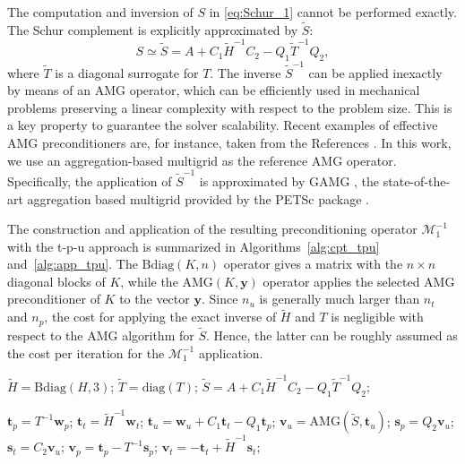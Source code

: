 \documentclass[3p,times]{elsarticle}
\theoremstyle{plain}
\newcommand{\Mat}[1]{#1}
\newcommand{\tS}{\widetilde{S}}
\newcommand{\tH}{\widetilde{H}}
\newcommand{\tT}{\widetilde{T}}
\begin{document}
The computation and inversion of $S$ in \eqref{eq:Schur_1} cannot be performed exactly. The Schur complement is explicitly approximated by $\tS$:
\begin{equation}
    S \simeq \tS = A + C_1 \Mat{\tH}^{-1} C_2 - Q_1 \tT^{-1} Q_2,
    \label{eq:appSchur_1}
\end{equation}
where $\tT$ is a diagonal surrogate for $T$. The inverse $\tS^{-1}$ can be applied inexactly by means of an AMG operator, which can be efficiently used in mechanical problems preserving a linear complexity with respect to the problem size. This is a key property to guarantee the solver scalability. Recent examples of effective AMG preconditioners are, for instance, taken from the References \cite{brandt2014bootstrap,
dambra2018bootcmatch, dambra2019improving, paludetto2019novel}. In this work, we use an aggregation-based multigrid as
the reference AMG operator. Specifically, the application of $\tS^{-1}$ is approximated by GAMG \cite{may2016extreme}, the
state-of-the-art aggregation based multigrid provided by the PETSc package
\cite{petsc-user-ref}. 

The construction and application of the resulting preconditioning operator $\mathcal{M}_1^{-1}$ with the t-p-u approach is summarized in Algorithms~\ref{alg:cpt_tpu} and~\ref{alg:app_tpu}. The $\text{Bdiag}(K,n)$ operator gives a matrix with the $n\times n$ diagonal blocks of $K$, while the $\text{AMG}(K,\mathbf{y})$ operator applies the selected AMG preconditioner of $K$ to the vector $\mathbf{y}$. Since $n_u$ is generally much larger than $n_t$ and $n_p$, the cost for applying the exact inverse of $\tH$ and $T$ is negligible with respect to the AMG algorithm for $\tS$. Hence, the latter can be roughly assumed as the cost per iteration for the $\mathcal{M}_1^{-1}$ application. 

\begin{algorithm}
\caption{ {\sc Preconditioner Construction: t-p-u approach}
[$\tH$, $\tS$]=cpt\_tpu($\mathcal{J}$).}
\label{alg:cpt_tpu}
\begin{algorithmic}[1]
\State $\tH = \text{Bdiag}(H,3)$;
\State $\tT = \text{diag}(T)$;
\State $\tS = A + C_1 \tH^{-1} C_2 - Q_1 \tT^{-1} Q_2$;
\end{algorithmic}
\end{algorithm}

\begin{algorithm}
\caption{ {\sc Preconditioner Application: t-p-u approach}
[$\mathbf{v}_u$, $\mathbf{v}_t$, $\mathbf{v}_p$]=app\_tpu($\mathcal{J}$, $\tH$, $\tS$, $\mathbf{w}_u$, $\mathbf{w}_t$, $\mathbf{w}_p$).}
\label{alg:app_tpu}
\begin{algorithmic}[1]
\State $\mathbf{t}_p = T^{-1} \mathbf{w}_p$;
\State $\mathbf{t}_t = \tH^{-1} \mathbf{w}_t$;
\State $\mathbf{t}_u = \mathbf{w}_u + C_1 \mathbf{t}_t - Q_1 \mathbf{t}_p$;
\State $\mathbf{v}_u = \text{AMG}(\tS, \mathbf{t}_u)$;
\State $\mathbf{s}_p = Q_2 \mathbf{v}_u$;
\State $\mathbf{s}_t = C_2 \mathbf{v}_u$;
\State $\mathbf{v}_p = \mathbf{t}_p - T^{-1} \mathbf{s}_p$;
\State $\mathbf{v}_t = - \mathbf{t}_t + \tH^{-1} \mathbf{s}_t$;
\end{algorithmic}
\end{algorithm}
\end{document}
